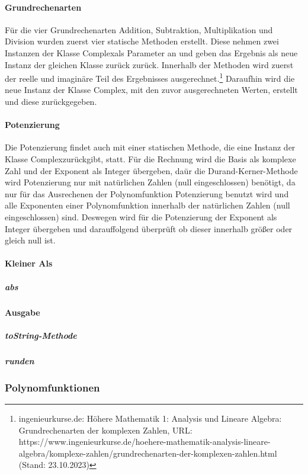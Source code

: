 \documentclass[12pt]{article}
\begin{document}
\paragraph{Grundrechenarten}
Für die vier Grundrechenarten Addition, Subtraktion, Multiplikation und Division wurden zuerst vier statische Methoden erstellt. Diese nehmen zwei Instanzen der Klasse \glqq Complex\grqq\space als Parameter an und geben das Ergebnis als neue Instanz der gleichen Klasse zurück zurück. Innerhalb der Methoden wird zuerst der reelle und imaginäre Teil des Ergebnisses ausgerechnet.\footnote{ingenieurkurse.de: Höhere Mathematik 1: Analysis und Lineare Algebra: Grundrechenarten der komplexen Zahlen, URL: https://www.ingenieurkurse.de/hoehere-mathematik-analysis-lineare-algebra/komplexe-zahlen/grundrechenarten-der-komplexen-zahlen.html (Stand: 23.10.2023)}
Daraufhin wird die neue Instanz der Klasse \glqq Complex\grqq, mit den zuvor ausgerechneten Werten, erstellt und diese zurückgegeben.

\paragraph{Potenzierung}
Die Potenzierung findet auch mit einer statischen Methode, die eine Instanz der Klasse \glqq Complex\grqq\space zurückgibt, statt. Für die Rechnung wird die Basis als komplexe Zahl und der Exponent als Integer übergeben, daür die Durand-Kerner-Methode wird Potenzierung nur mit natürlichen Zahlen (null eingeschlossen) benötigt, da nur für das Ausrechenen der Polynomfunktion Potenzierung benutzt wird und alle Exponenten einer Polynomfunktion innerhalb der natürlichen Zahlen (null eingeschlossen) sind. Deswegen wird für die Potenzierung der Exponent als Integer übergeben und darauffolgend überprüft ob dieser innerhalb größer oder gleich null ist.


\paragraph{Kleiner Als}


\subparagraph{abs}

\paragraph{Ausgabe}
\subparagraph{toString-Methode}
\subparagraph{runden}

    
\subsubsection{Polynomfunktionen}
\end{document}
